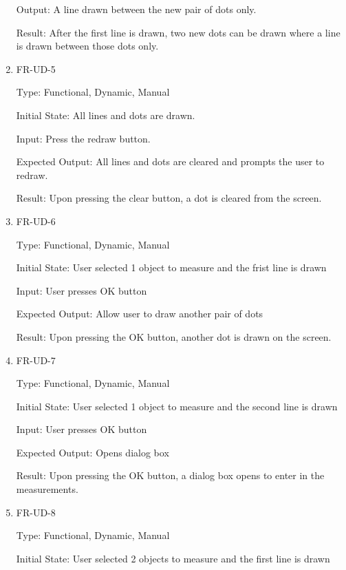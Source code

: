 \documentclass[12pt, titlepage]{article}
\begin{document}
\begin{enumerate}
					Output: A line drawn between the new pair of dots only.
					
					Result: After the first line is drawn, two new dots can be drawn where a line is drawn between those dots only.
					
					\item{FR-UD-5\\}
					
					Type: Functional, Dynamic, Manual
					
					Initial State: All lines and dots are drawn.
					
					Input: Press the redraw button.
					
					Expected Output: All lines and dots are cleared and prompts the user to redraw.
					
					Result: Upon pressing the clear button, a dot is cleared from the screen. 

					
					\item{FR-UD-6\\}
					
					Type: Functional, Dynamic, Manual
					
					Initial State: User selected 1 object to measure and the frist line is drawn
					
					Input: User presses OK button
					
					Expected Output: Allow user to draw another pair of dots
					
					Result: Upon pressing the OK button, another dot is drawn on the screen.

\item{FR-UD-7\\}
					
					Type: Functional, Dynamic, Manual
					
					Initial State: User selected 1 object to measure and the second line is drawn
					
					Input: User presses OK button
					
					Expected Output: Opens dialog box
					
					Result: Upon pressing the OK button, a dialog box opens to enter in the measurements. 

\item{FR-UD-8\\}
					
					Type: Functional, Dynamic, Manual
					
					Initial State: User selected 2 objects to measure and the first line is drawn
					

\end{enumerate}
\end{document}

